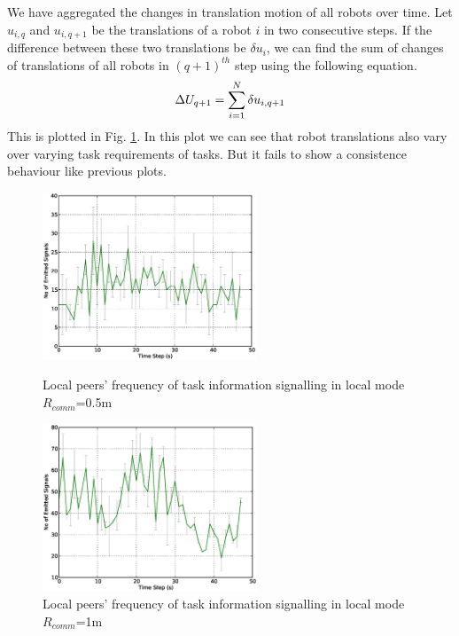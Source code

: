 \documentclass[letterpaper, 10 pt, conference]{ieeeconf}  %
\begin{document}
We have aggregated the changes in translation motion of all robots over time. Let $u_{i,q}$ and $u_{i,q+1}$ be the translations of a robot $i$ in two consecutive steps. If the difference between these two translations be $\delta u_{i}$, we can find the sum of changes of translations of all robots in $(q+1)^{th}$ step using the following equation.
\begin{equation}
\small 
\Delta U_{q+1} = \sum_{i=1}^{N} \delta u_{i, q+1} 
\label{eqn:Delta-Tr}
\end{equation}
This is plotted in Fig. \ref{fig:translation-stat}. In this plot we can see that robot translations also vary over varying task requirements of tasks. But it fails to show a consistence behaviour like previous plots.\\
%
\begin{figure}
\begin{minipage}[t]{0.5\linewidth}
\centering
\includegraphics[height=5cm, angle=0]
{images/local-500cm/Local-500cm-SignalingFreqStat.eps}
\caption{\small Local peers' frequency of task information signalling in local mode $R_{comm}$=0.5m}
\label{fig:signal-frequency-stat} %
\end{minipage}
\hspace{0.5cm}
\begin{minipage}[t]{0.5\linewidth}
\centering
\includegraphics[height=5cm, angle=0]{images/local-1m/Local-1m-SignalingFreqStat.eps}
\caption{\small Local peers' frequency of task information signalling in local mode $R_{comm}$=1m}
\label{fig:translation-stat} %
\end{minipage}
\end{figure}
\end{document}
